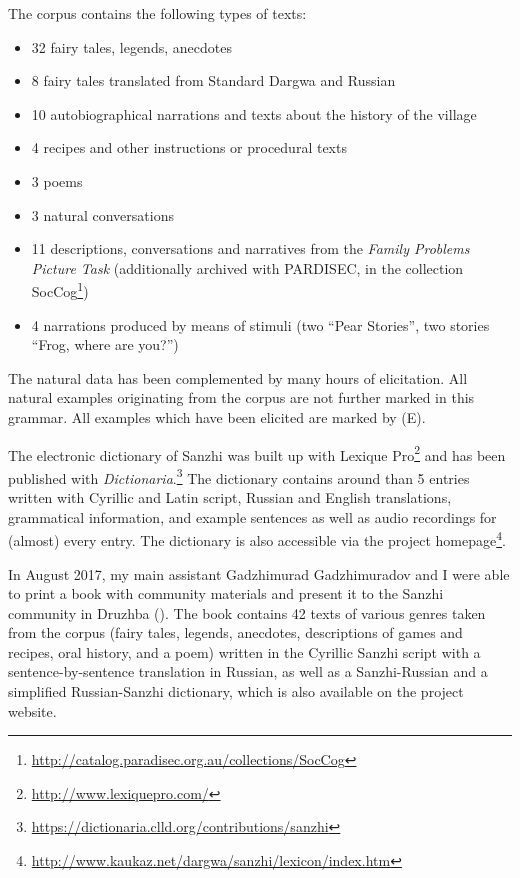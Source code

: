 The corpus contains the following types of texts:

\begin{itemize}
	\item 32 fairy tales, legends, anecdotes
	\item 8 fairy tales translated from Standard Dargwa and Russian
	\item 10 autobiographical narrations and texts about the history of the village
	\item 4 recipes and other instructions or procedural texts
	\item 3 poems
	\item 3 natural conversations
	\item 11 descriptions, conversations and narratives from the \textit{\textit{Family Problems Picture Task}} \citep{SanRoqueEtAl2012} (additionally archived with PARDISEC, in the collection SocCog\footnote{\url{http://catalog.paradisec.org.au/collections/SocCog}})
	\item 4 narrations produced by means of stimuli (two ``Pear Stories'', two stories ``Frog, where are you?'') 
\end{itemize}

The natural data has been complemented by many hours of elicitation. All natural examples originating from the corpus are not further marked in this grammar. All examples which have been elicited are marked by (E).




\sloppy The electronic dictionary of Sanzhi was built up with Lexique Pro\footnote{\url{http://www.lexiquepro.com/}} and has been published with \textit{Dictionaria}.\footnote{\url{https://dictionaria.clld.org/contributions/sanzhi}} The dictionary contains around than 5 entries written with Cyrillic and Latin script, Russian and English translations, grammatical information, and example sentences as well as audio recordings for (almost) every entry. The dictionary is also accessible via the project homepage\footnote{\url{http://www.kaukaz.net/dargwa/sanzhi/lexicon/index.htm}}.

In August 2017, my main assistant Gadzhimurad Gadzhimuradov and I were able to print a book with community materials and present it to the Sanzhi community in Druzhba (). The book contains 42 texts of various genres taken from the corpus (fairy tales, legends, anecdotes, descriptions of games and recipes, oral history, and a poem) written in the Cyrillic Sanzhi script with a sentence-by-sentence translation in Russian, as well as a Sanzhi-Russian and a simplified Russian-Sanzhi dictionary, which is also available on the project website.

